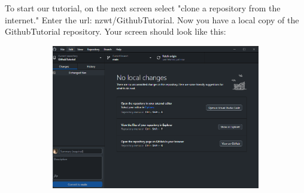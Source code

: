 \documentclass{article}
\begin{document}
    To start our tutorial, on the next screen select "clone a repository from the internet." Enter the url: nzwt/GithubTutorial. Now you have a local copy of the GithubTutorial repository. Your screen should look like this:
    \begin{figure}
        \centering
        
\begin{figure}
            \centering
            \includegraphics[width=1\linewidth]{MainScreen.png}
        \end{figure}
        
        
    \end{figure}
\end{document}
